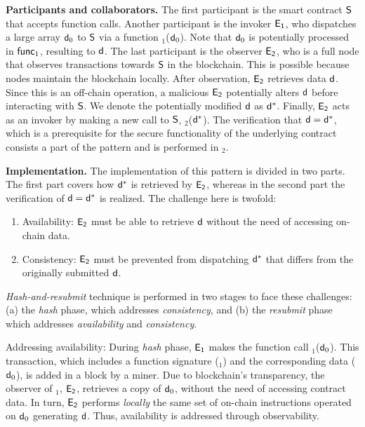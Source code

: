 \noindent \textbf{Participants and collaborators.} The first participant is the
smart contract $\mathsf{S}$ that accepts function calls. Another participant is
the invoker $\mathsf{E_{1}}$, who dispatches a large array $\mathsf{d}_0$ to $\mathsf{S}$
via a function \texttt{\proc$_1$}($\mathsf{d}_0$). Note that $\mathsf{d}_0$ is
potentially processed in $\textsf{func}_1$, resulting to $\mathsf{d}$. The last participant
is the observer $\mathsf{E_{2}}$, who is a full node that observes transactions
towards $\mathsf{S}$ in the blockchain. This is possible because nodes maintain
the blockchain locally. After observation, $\mathsf{E_{2}}$ retrieves data $\mathsf{d}$.
Since this is an off-chain operation, a malicious $\mathsf{E_{2}}$ potentially
alters $\mathsf{d}$ before interacting with $\mathsf{S}$. We denote the
potentially modified $\mathsf{d}$ as $\mathsf{d^*}$. Finally, $\mathsf{E_{2}}$ acts as an
invoker by making a new call to $\mathsf{S}$, \texttt{\proc$_2$}($\mathsf{d^*}$). The
verification that $\mathsf{d} = \mathsf{d^*}$, which is a prerequisite for the secure
functionality of the underlying contract consists a part of the pattern and is
performed in \texttt{\proc$_2$}.

\noindent \textbf{Implementation.} The implementation of this pattern is
divided in two parts. The first part covers how $\mathsf{d^*}$ is retrieved by
$\mathsf{E_{2}}$, whereas in the second part the verification of $\mathsf{d}=\mathsf{d^*}$ is
realized. The challenge here is twofold:

\begin{enumerate}

    \item Availability: $\mathsf{E_{2}}$ must be able to retrieve $\mathsf{d}$ without
        the need of accessing on-chain data.

    \item Consistency: $\mathsf{E_{2}}$ must be prevented from dispatching $\mathsf{d^*}$
        that differs from the originally submitted $\mathsf{d}$.

\end{enumerate}

\noindent
\emph{Hash-and-resubmit} technique is performed in two
stages to face these challenges: (a) the \emph{hash} phase, which addresses
\emph{consistency}, and (b) the \emph{resubmit} phase which addresses
\emph{availability} and \emph{consistency}.

\noindent \textsf{Addressing availability:} During \emph{hash} phase,
$\mathsf{E_{1}}$ makes the function call \texttt{\proc}$_1$($\mathsf{d}_0$). This
transaction, which includes a function signature (\texttt{\proc$_1$}) and the
corresponding data ($\mathsf{d}_0$), is added in a block by a miner. Due to
blockchain's transparency, the observer of \texttt{\proc}$_1$, $\mathsf{E_{2}}$,
retrieves a copy of $\mathsf{d}_0$, without the need of accessing contract data. In
turn, $\mathsf{E_{2}}$ performs \emph{locally} the same set of on-chain instructions
operated on $\mathsf{d}_0$ generating $\mathsf{d}$. Thus, availability is addressed
through observability.

